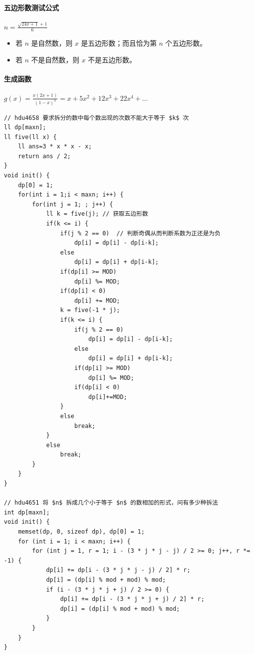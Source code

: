 \paragraph{五边形数测试公式} $n = \frac{\sqrt{24x+1}+1}{6}$

\begin{itemize}
    \item 若 $n$ 是自然数，则 $x$ 是五边形数；而且恰为第 $n$ 个五边形数。
    \item 若 $n$ 不是自然数，则 $x$ 不是五边形数。
\end{itemize}

\paragraph{生成函数} $g(x) = \frac{x(2x+1)}{(1-x)^3} = x + 5x^2 + 12x^3 + 22x^4 + ...$

\begin{verbatim}
// hdu4658 要求拆分的数中每个数出现的次数不能大于等于 $k$ 次
ll dp[maxn];  
ll five(ll x) {  
    ll ans=3 * x * x - x;  
    return ans / 2;  
}  
void init() {  
    dp[0] = 1;  
    for(int i = 1;i < maxn; i++) {  
        for(int j = 1; ; j++) {  
            ll k = five(j); // 获取五边形数  
            if(k <= i) {  
                if(j % 2 == 0)  // 判断奇偶从而判断系数为正还是为负  
                    dp[i] = dp[i] - dp[i-k];  
                else  
                    dp[i] = dp[i] + dp[i-k];  
                if(dp[i] >= MOD)
                    dp[i] %= MOD;  
                if(dp[i] < 0)
                    dp[i] += MOD;  
                k = five(-1 * j);  
                if(k <= i) {  
                    if(j % 2 == 0)  
                        dp[i] = dp[i] - dp[i-k];
                    else  
                        dp[i] = dp[i] + dp[i-k];
                    if(dp[i] >= MOD)
                        dp[i] %= MOD;  
                    if(dp[i] < 0)
                        dp[i]+=MOD;  
                }  
                else  
                    break;  
            }  
            else  
                break;  
        }  
    }  
}  

// hdu4651 将 $n$ 拆成几个小于等于 $n$ 的数相加的形式，问有多少种拆法
int dp[maxn];
void init() {
    memset(dp, 0, sizeof dp), dp[0] = 1;
    for (int i = 1; i < maxn; i++) {
        for (int j = 1, r = 1; i - (3 * j * j - j) / 2 >= 0; j++, r *= -1) {
            dp[i] += dp[i - (3 * j * j - j) / 2] * r;
            dp[i] = (dp[i] % mod + mod) % mod;
            if (i - (3 * j * j + j) / 2 >= 0) {
                dp[i] += dp[i - (3 * j * j + j) / 2] * r;
                dp[i] = (dp[i] % mod + mod) % mod;
            }
        }
    }
}
\end{verbatim}